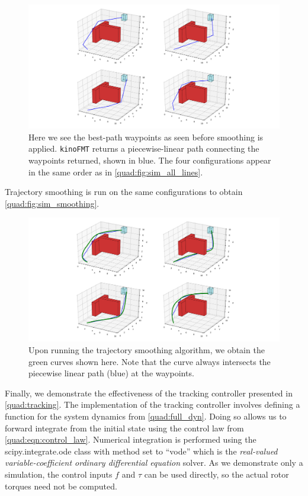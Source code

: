 \begin{figure}
    \centering
    \hspace*{-4.7cm}
    \includegraphics[scale=0.5]{./figures/sim_waypoints}
    \caption[Quadrotor simulation waypoints]{Here we see the best-path waypoints as seen before smoothing is applied. \texttt{kinoFMT} returns a piecewise-linear path connecting the waypoints returned, shown in blue. The four configurations appear in the same order as in \autoref{quad:fig:sim_all_lines}.}
\label{quad:fig:sim_waypoints}
\end{figure}

Trajectory smoothing is run on the same configurations to obtain \autoref{quad:fig:sim_smoothing}.

\begin{figure}
    \centering
    \hspace*{-4.7cm}
    \includegraphics[scale=0.5]{./figures/sim_smoothing}
    \caption[Quadrotor simulation smooth trajectory]{Upon running the trajectory smoothing algorithm, we obtain the green curves shown here. Note that the curve always intersects the piecewise linear path (blue) at the waypoints.}
\label{quad:fig:sim_smoothing}
\end{figure}

Finally, we demonstrate the effectiveness of the tracking controller presented in \autoref{quad:tracking}. The implementation of the tracking controller involves defining a function for the system dynamics from \autoref{quad:full_dyn}. Doing so allows us to forward integrate from the initial state using the control law from \autoref{quad:eqn:control_law}. Numerical integration is performed using the scipy.integrate.ode class with method set to ``vode'' which is the \emph{real-valued variable-coefficient ordinary differential equation} solver. As we demonstrate only a simulation, the control inputs $f$ and $\tau$ can be used directly, so the actual rotor torques need not be computed.

